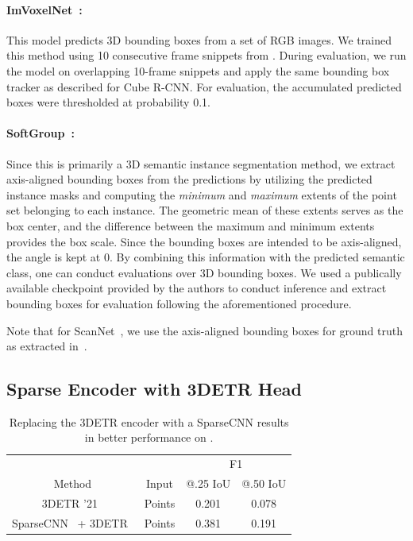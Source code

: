 \paragraph{ImVoxelNet~\cite{rukhovich2022imvoxelnet}:} This model predicts 3D bounding boxes from a set of RGB images. We trained this method using 10 consecutive frame snippets from \DatasetName{}. During evaluation, we run the model on overlapping 10-frame snippets and apply the same bounding box tracker as described for Cube R-CNN. For evaluation, the accumulated predicted boxes were thresholded at probability 0.1.
    
\paragraph{SoftGroup~\cite{vu2022softgroup}:} Since this is primarily a 3D semantic instance segmentation method, we extract axis-aligned bounding boxes from the predictions by utilizing the predicted instance masks and computing the \textit{minimum} and \textit{maximum} extents of the point set belonging to each instance. The geometric mean of these extents serves as the box center, and the difference between the maximum and minimum extents provides the box scale. Since the bounding boxes are intended to be axis-aligned, the angle is kept at 0. By combining this information with the predicted semantic class, one can conduct evaluations over 3D bounding boxes. We used a publically available checkpoint provided by the authors to conduct inference and extract bounding boxes for evaluation following the aforementioned procedure. 

Note that for ScanNet~\cite{dai2017scannet}, we use the axis-aligned bounding boxes for ground truth as extracted in~\cite{misra2021end,qi2019deep}.

\subsection{Sparse Encoder with 3DETR Head}
\label{subsec:sparsecnn_threedetr}

\begin{table}[h]
\centering
    \caption{Replacing the 3DETR encoder with a SparseCNN results in better performance on \DatasetName.}
    \begin{tabular}{c|c|cc}
        & & \multicolumn{2}{c}{F1} \\
         Method & Input & @.25 IoU & @.50 IoU \\
        \hline \hline
        3DETR '21~\cite{misra2021end} & Points & 0.201 & 0.078 \\
        SparseCNN~\cite{tang2022torchsparse} + 3DETR~\cite{misra2021end} & Points & 0.381 & 0.191 \\
    \end{tabular}
    \label{tab:sparsecnn_3detr}
\end{table}

